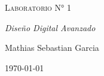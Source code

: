 \documentclass{article}
\begin{document}
\begin{titlepage}
    \centering
    \vspace{4cm}
    {\scshape\Huge Laboratorio N° 1 \par}
    \vspace{3cm}
    {\itshape\Large Diseño Digital Avanzado \par}
    \vfill
    {\Large Mathias Sebastian Garcia\par}
    \vfill
    {\Large \today\par}
\end{titlepage}

\tableofcontents




\end{document}
